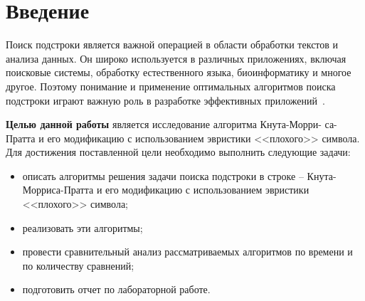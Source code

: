 \chapter*{Введение}

Поиск подстроки является важной операцией в области обработки текстов и анализа данных. 
Он широко используется в различных приложениях, включая поисковые системы, обработку естественного языка, биоинформатику и многое другое. 
Поэтому понимание и применение оптимальных алгоритмов поиска подстроки играют важную роль в разработке эффективных приложений~.

\textbf{Целью данной работы} является исследование алгоритма Кнута-Морри-
са-Пратта и его модификацию с использованием эвристики <<плохого>> символа.
Для достижения поставленной цели необходимо выполнить следующие задачи:
\begin{itemize}[label=---]
    \item описать алгоритмы решения задачи поиска подстроки в строке -- Кнута-Морриса-Пратта и его модификацию с использованием эвристики <<плохого>> символа;
    \item реализовать эти алгоритмы;
    \item провести сравнительный анализ рассматриваемых алгоритмов по времени и по количеству сравнений;
    \item подготовить отчет по лабораторной работе.
\end{itemize}

